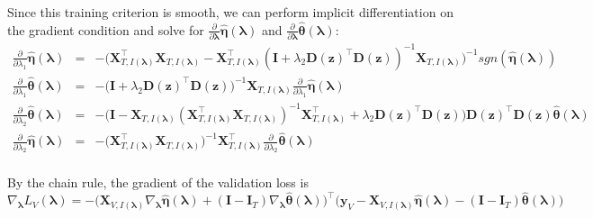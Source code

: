 \documentclass[10pt,letterpaper]{article}
\begin{document}
Since this training criterion is smooth, we can perform implicit differentiation on the gradient condition and solve for $\frac{\partial}{\partial \boldsymbol \lambda} \hat{\boldsymbol\eta}(\boldsymbol{\lambda}) $ and $\frac{\partial}{\partial \boldsymbol \lambda} \hat{\boldsymbol\theta}(\boldsymbol{\lambda}) $: 
\begin{equation*}
\begin{array}{lcl}
\frac{\partial}{\partial \lambda_1} \hat{\boldsymbol\eta}(\boldsymbol{\lambda})  &=&
-\bigg(\boldsymbol{X}_{T, I(\boldsymbol\lambda)}^\top \boldsymbol{X}_{T, I(\boldsymbol\lambda)}
- \boldsymbol{X}_{T, I(\boldsymbol\lambda)}^\top (\boldsymbol{I}
+ \lambda_2 \boldsymbol{D}(\boldsymbol{z})^\top\boldsymbol{D}(\boldsymbol{z}))^{-1} \boldsymbol{X}_{T, I(\boldsymbol\lambda)} \bigg)^{-1} 
sgn( \hat{\boldsymbol\eta}(\boldsymbol{\lambda})) \\
\frac{\partial }{\partial \lambda_1} \hat{\boldsymbol\theta}(\boldsymbol{\lambda}) &=&
-\bigg(\boldsymbol{I}
+ \lambda_2 \boldsymbol{D}(\boldsymbol{z})^\top \boldsymbol{D}(\boldsymbol{z})\bigg)^{-1}
 \boldsymbol{X}_{T, I(\boldsymbol\lambda)} \frac{\partial}{\partial \lambda_1} \hat{\boldsymbol\eta}(\boldsymbol{\lambda})
\\
\frac{\partial}{\partial \lambda_2}  \hat{\boldsymbol\theta}(\boldsymbol{\lambda}) &=&
-\bigg(\boldsymbol{I}
- \boldsymbol{X}_{T, I(\boldsymbol\lambda)} (\boldsymbol{X}_{T, I(\boldsymbol\lambda)}^\top\boldsymbol{X}_{T, I(\boldsymbol\lambda)})^{-1} \boldsymbol{X}_{T, I(\boldsymbol\lambda)}^\top + \lambda_2 \boldsymbol{D}(\boldsymbol{z})^\top\boldsymbol{D}(\boldsymbol{z}) \bigg)
\boldsymbol{D}(\boldsymbol{z})^\top\boldsymbol{D}(\boldsymbol{z}) \hat{\boldsymbol\theta}(\boldsymbol{\lambda})
\\
\frac{\partial}{\partial \lambda_2} \hat{\boldsymbol\eta}(\boldsymbol{\lambda}) &=&
- \bigg( \boldsymbol{X}_{T, I(\boldsymbol\lambda)}^\top\boldsymbol{X}_{T, I(\boldsymbol\lambda)}\bigg)^{-1}
\boldsymbol{X}_{T, I(\boldsymbol\lambda)}^\top
\frac{\partial}{\partial \lambda_2}  \hat{\boldsymbol\theta}(\boldsymbol{\lambda})\\
\end{array}
\end{equation*}

By the chain rule, the gradient of the validation loss is
\begin{equation*}
\nabla_{\boldsymbol{\lambda}} L_V(\boldsymbol{\lambda}) =
- \bigg(
\boldsymbol{X}_{V, I(\boldsymbol\lambda)} \nabla_{\boldsymbol{\lambda}} \hat{\boldsymbol\eta}(\boldsymbol{\lambda})
+ (\boldsymbol I - \boldsymbol{I}_T) \nabla_{\boldsymbol{\lambda}} \hat{\boldsymbol\theta}(\boldsymbol{\lambda})
\bigg )^\top
\bigg (
\boldsymbol{y}_V
- \boldsymbol{X}_{V, I(\boldsymbol\lambda)} \hat{\boldsymbol\eta}(\boldsymbol{\lambda})
- (\boldsymbol I - \boldsymbol{I}_T) \hat{\boldsymbol\theta}(\boldsymbol{\lambda})
\bigg )
\end{equation*}
\end{document}
